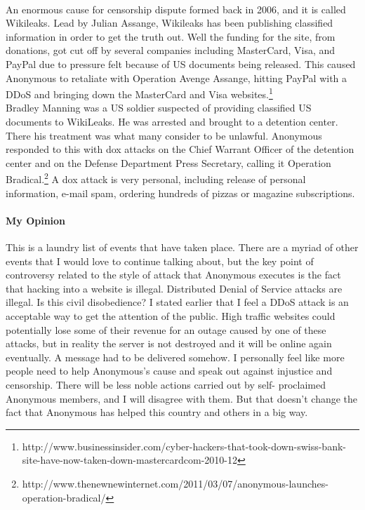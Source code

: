 \documentclass{article}
\begin{document}
\paragraph{}
An enormous cause for censorship dispute formed back in 2006, and it is called 
Wikileaks.  Lead by Julian Assange, Wikileaks has been publishing classified 
information in order to get the truth out. Well the funding for the site, from 
donations, got cut off by several companies including MasterCard, Visa, and
PayPal due to pressure felt because of US documents being released.  This caused
Anonymous to retaliate with Operation Avenge Assange, hitting PayPal with a DDoS 
and bringing down the MasterCard and Visa websites.\footnote{
http://www.businessinsider.com/cyber-hackers-that-took-down-swiss-bank-site-have-now-taken-down-mastercardcom-2010-12}\\
Bradley Manning was a US soldier suspected of providing classified US documents
to WikiLeaks.  He was arrested and brought to a detention center.  There his
treatment was what many consider to be unlawful.  Anonymous responded to this
with dox attacks on the Chief Warrant Officer of the detention center and on
the Defense Department Press Secretary, calling it Operation Bradical.\footnote{
http://www.thenewnewinternet.com/2011/03/07/anonymous-launches-operation-bradical/}
A dox attack is very personal, including release of personal information, e-mail 
spam, ordering hundreds of pizzas or magazine subscriptions.  

\paragraph{My Opinion\\}
This is a laundry list of events that have taken place.  There are a myriad of
other events that I would love to continue talking about, but the key point of
controversy related to the style of attack that Anonymous executes is the fact
that hacking into a website is illegal.  Distributed Denial of Service attacks
are illegal.  Is this civil disobedience?  I stated earlier that I feel a DDoS
attack is an acceptable way to get the attention of the public.  High traffic
websites could potentially lose some of their revenue for an outage caused by
one of these attacks, but in reality the server is not destroyed and it will be
online again eventually.  A message had to be delivered somehow.  I personally
feel like more people need to help Anonymous's cause and speak out against
injustice and censorship.  There will be less noble actions carried out by self-
proclaimed Anonymous members, and I will disagree with them.  But that doesn't
change the fact that Anonymous has helped this country and others in a big way.
\end{document}
